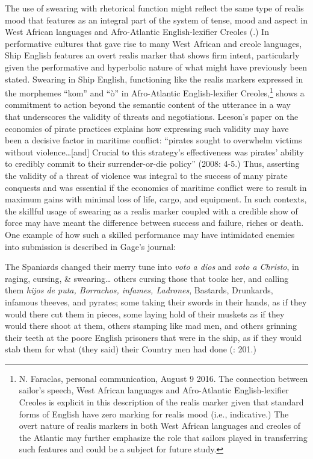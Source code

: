 The use of swearing with rhetorical function might reflect the same type of realis mood that features as an integral part of the system of tense, mood and aspect in West African languages and Afro-Atlantic English-lexifier Creoles (\citealt{FaraclasEtAl2016}.) In performative cultures that gave rise to many West African and creole languages, Ship English features an overt realis marker that shows firm intent, particularly given the performative and hyperbolic nature of what might have previously been stated. Swearing in Ship English, functioning like the realis markers expressed in the morphemes “kom” and “ò” in Afro-Atlantic English-lexifier Creoles,\footnote{N. Faraclas, personal communication, August 9 2016. The connection between sailor’s speech, West African languages and Afro-Atlantic English-lexifier Creoles is explicit in this description of the realis marker given that standard forms of English have zero marking for realis mood (i.e., indicative.) The overt nature of realis markers in both West African languages and creoles of the Atlantic may further emphasize the role that sailors played in transferring such features and could be a subject for future study.} shows a commitment to action beyond the semantic content of the utterance in a way that underscores the validity of threats and negotiations. Leeson’s paper on the economics of pirate practices explains how expressing such validity may have been a decisive factor in maritime conflict: “pirates sought to overwhelm victims without violence…[and] Crucial to this strategy’s effectiveness was pirates’ ability to credibly commit to their surrender-or-die policy” (2008: 4-5.) Thus, asserting the validity of a threat of violence was integral to the success of many pirate conquests and was essential if the economics of maritime conflict were to result in maximum gains with minimal loss of life, cargo, and equipment. In such contexts, the skillful usage of swearing as a realis marker coupled with a credible show of force may have meant the difference between success and failure, riches or death. One example of how such a skilled performance may have intimidated enemies into submission is described in Gage’s journal:

The Spaniards changed their merry tune into \textit{voto a dios} and \textit{voto a Christo}, in raging, cursing, \& swearing… others cursing those that tooke her, and calling them \textit{hijos de puta, Borrachos, infames, Ladrones}, Bastards, Drunkards, infamous theeves, and pyrates; some taking their swords in their hands, as if they would there cut them in pieces, some laying hold of their muskets as if they would there shoot at them, others stamping like mad men, and others grinning their teeth at the poore English prisoners that were in the ship, as if they would stab them for what (they said) their Country men had done (\citealt{Gage1648}: 201.)


